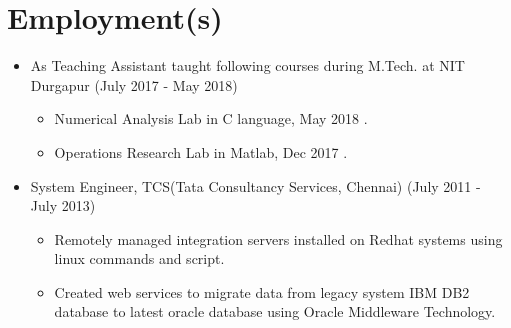 \documentclass[a4paper,10pt]{article}
\begin{document}
	\section{Employment(s)}
	\begin{itemize}
			\item As Teaching Assistant taught following courses during M.Tech. at NIT Durgapur (July 2017 - May 2018)
                \begin{itemize}
                    \item Numerical Analysis Lab in C language, May 2018 .
                    \item Operations Research Lab in Matlab, Dec 2017 .
                \end{itemize}
            \item System Engineer, TCS(Tata Consultancy Services, Chennai) (July 2011 - July 2013)
		        \begin{itemize}
			    	\item Remotely managed integration servers installed on Redhat systems using linux commands and script.
					\item Created web services to migrate data from legacy system IBM DB2 database to latest oracle database using Oracle Middleware Technology.
			\end{itemize}
	\end{itemize}
    
    
\end{document}
